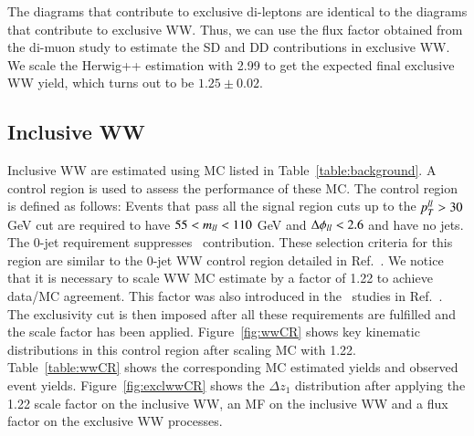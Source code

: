 \begin{table}
\centering
\caption{Results for the flux factor study on exclusive di-muons. A large flux factor 
implies that the contribution of SD and DD processes is non-negligible.}
\label{table:flux}
\end{table}

The diagrams that contribute to exclusive di-leptons are identical to the diagrams that contribute to 
exclusive WW. Thus, we can use the flux factor obtained from the di-muon study to estimate the 
SD and DD contributions in exclusive WW. We scale the Herwig++ estimation with 2.99 
to get the expected final exclusive WW yield, which turns out to be $1.25\pm0.02$. 

\subsection{Inclusive WW}
\par Inclusive WW are estimated using MC listed in Table~\ref{table:background}. A control region is 
used to assess the performance of these MC. The control region is defined as follows: Events that pass all 
the signal region cuts up to the $p_{T}^{ll}>30$ GeV cut are required to have $55<m_{ll}<110$ GeV and 
$\Delta\phi_{ll}<2.6$ and have no jets. The 0-jet requirement suppresses \ttbar\ contribution. These selection criteria 
for this region are similar to the 0-jet WW control region detailed in Ref.~\cite{ATLASCONF2014060}. 
We notice that it is necessary to scale WW MC estimate by a factor of 1.22 to achieve data/MC agreement. 
This factor was also introduced in the \hwwll\ studies in Ref.~\cite{ATLASCONF2014060}. 
The exclusivity cut is then imposed after all these requirements are fulfilled and the scale 
factor has been applied.
Figure~\ref{fig:wwCR} shows key kinematic distributions in this control region after scaling MC with 1.22.
Table~\ref{table:wwCR} shows the corresponding MC estimated yields and observed event yields.
Figure~\ref{fig:exclwwCR} shows the $\Delta z_1$ distribution after applying the 1.22 scale factor on 
the inclusive WW, an MF on the inclusive WW and a flux factor on the exclusive WW processes.


